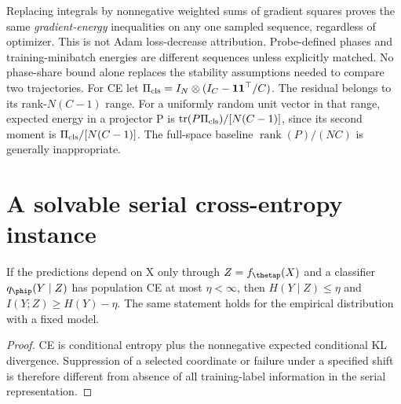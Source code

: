 \begin{remark}
Replacing integrals by nonnegative weighted sums of gradient squares
proves the same \emph{gradient-energy} inequalities on any one sampled
sequence, regardless of optimizer. This is not Adam loss-decrease
attribution. Probe-defined phases and training-minibatch energies are
different sequences unless explicitly matched. No phase-share bound
alone replaces the stability assumptions needed to compare two trajectories.
For CE let $\Pi_{\rm cls}=I_N\otimes(I_C-\boldsymbol1\boldsymbol1^\top/C)$.
The residual belongs to its rank-$N(C-1)$ range. For a uniformly random
unit vector in that range, expected energy in a projector P is
$\operatorname{tr}(P\Pi_{\rm cls})/[N(C-1)]$, since its second moment is
$\Pi_{\rm cls}/[N(C-1)]$. The full-space baseline
$\operatorname{rank}(P)/(NC)$ is generally inappropriate.
\end{remark}

\section{A solvable serial cross-entropy instance}
\label{sec:astra_serial}
\begin{proposition}
\label{prop:astra_information}
If the predictions depend on X only through $Z=f_\thetap(X)$ and a
classifier $q_\phip(Y\mid Z)$ has population CE at most $\eta<\infty$,
then $H(Y\mid Z)\le\eta$ and $I(Y;Z)\ge H(Y)-\eta$.
The same statement holds for the empirical distribution with a fixed model.
\end{proposition}
\begin{proof}
CE is conditional entropy plus the nonnegative expected conditional KL
divergence. Suppression of a selected coordinate or failure under a
specified shift is therefore different from absence of all training-label
information in the serial representation.
\end{proof}

